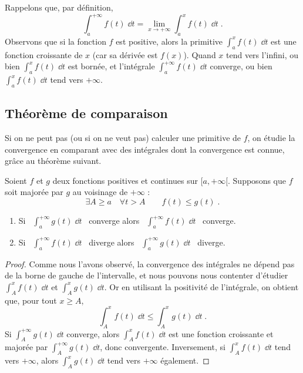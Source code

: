\documentclass[class=report,crop=false]{standalone}
\begin{document}


Rappelons que, par définition,
$$
\int_a^{+\infty} f(t)\;\dd t = \lim_{x\rightarrow +\infty} \int_a^x f(t)\;\dd t\;.
$$
Observons que si la fonction $f$ est positive, alors la primitive
$\int_a^x f(t)\;\dd t$ est une fonction croissante de $x$ (car sa
dérivée est $f(x)$). Quand $x$ tend vers l'infini, ou bien
$\int_a^x f(t)\;\dd t$ est bornée, et l'intégrale $\int_a^{+\infty}
f(t)\;\dd t$ converge, ou bien $\int_a^x f(t)\;\dd t$ tend vers
$+\infty$. 


\subsection{Théorème de comparaison}

Si on ne peut pas (ou si on ne veut pas) calculer une primitive de $f$, 
on étudie la convergence en
comparant avec des intégrales dont la convergence est connue,
gr\^ace au théorème suivant.

\begin{theoreme}
\label{th:comparaisonintegrales1}
Soient $f$ et $g$ deux fonctions positives et continues sur
$[a,+\infty[$. Supposons que $f$ soit majorée par $g$ au voisinage de
$+\infty$ :
$$
\exists A\ge a \quad \forall t>A \qquad f(t)\le g(t)\;.
$$
\begin{enumerate}
  \item Si \  $\int_a^{+\infty} g(t)\;\dd t$ \ converge alors \  $\int_a^{+\infty} f(t)\;\dd t$ \  converge.
  \item Si \  $\int_a^{+\infty} f(t)\;\dd t$ \  diverge alors \  $\int_a^{+\infty} g(t)\;\dd t$ \  diverge.
\end{enumerate}
\end{theoreme}


\begin{proof}
Comme nous l'avons observé, la convergence des intégrales ne
dépend pas de la borne de gauche de l'intervalle, et nous pouvons
nous contenter d'étudier $\int_A^x f(t)\;\dd t$ et $\int_A^x g(t)\;\dd t$.
Or en utilisant la positivité de l'intégrale, on obtient que, pour
tout $x \ge A$,
$$\int_A^x f(t)\;\dd t \le \int_A^x g(t)\;\dd t\;.$$ 
Si $\int_A^{+\infty} g(t)\;\dd t$ converge, alors $\int_A^x f(t)\;\dd t$ est
une fonction croissante et majorée par $\int_A^{+\infty} g(t)\;\dd t$,
donc convergente. Inversement, si $\int_A^{x} f(t)\;\dd t$ tend vers
$+\infty$, alors $\int_A^{x} g(t)\;\dd t$ tend vers $+\infty$ également.
\end{proof}
\end{document}
